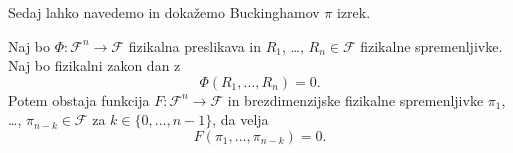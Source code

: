 \documentclass[mat2, tisk]{fmfdelo}
\begin{document}
Sedaj lahko navedemo in dokažemo Buckinghamov $\pi$ izrek.

 \begin{izrek}[Buckinghamov $\pi$]
 Naj bo $\Phi: \mathcal{F}^n \rightarrow \mathcal{F}$ fizikalna preslikava in 
 $R_1$, \dots, $R_n \in \mathcal{F}$ fizikalne spremenljivke. Naj bo fizikalni zakon dan z 
 \begin{equation}
 \Phi(R_1, \dots, R_n) = 0.
 \end{equation}
 Potem obstaja funkcija 
 $F: \mathcal{F}^n \rightarrow \mathcal{F}$ in brezdimenzijske fizikalne spremenljivke 
 $\pi_1$, \dots, $\pi_{n-k} \in \mathcal{F}$ za $k \in \{0, \dots, n-1\}$, da velja
 \begin{equation}
   F(\pi_1, \dots, \pi_{n-k}) = 0.
 \end{equation}
 \end{izrek}
\end{document}
